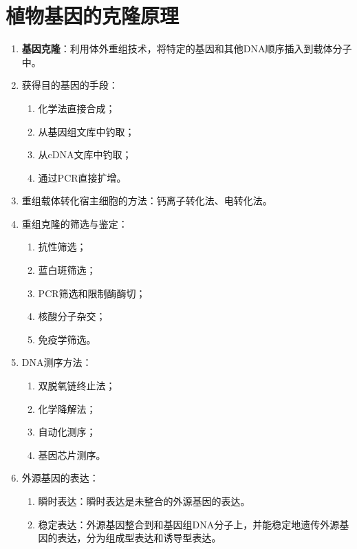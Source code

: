 \section{植物基因的克隆原理}
\begin{enumerate}
    \item \textbf{基因克隆}：利用体外重组技术，将特定的基因和其他DNA顺序插入到载体分子中。
    \item 获得目的基因的手段：
    \begin{enumerate}
        \item 化学法直接合成；
        \item 从基因组文库中钓取；
        \item 从cDNA文库中钓取；
        \item 通过PCR直接扩增。
    \end{enumerate}
    \item 重组载体转化宿主细胞的方法：钙离子转化法、电转化法。
    \item 重组克隆的筛选与鉴定：
    \begin{enumerate}
        \item 抗性筛选；
        \item 蓝白斑筛选；
        \item PCR筛选和限制酶酶切；
        \item 核酸分子杂交；
        \item 免疫学筛选。
    \end{enumerate}
    \item DNA测序方法：
    \begin{enumerate}
        \item 双脱氧链终止法；
        \item 化学降解法；
        \item 自动化测序；
        \item 基因芯片测序。
    \end{enumerate}
    \item 外源基因的表达：
    \begin{enumerate}
        \item 瞬时表达：瞬时表达是未整合的外源基因的表达。
        \item 稳定表达：外源基因整合到和基因组DNA分子上，并能稳定地遗传外源基因的表达，分为组成型表达和诱导型表达。
    \end{enumerate}
\end{enumerate}


